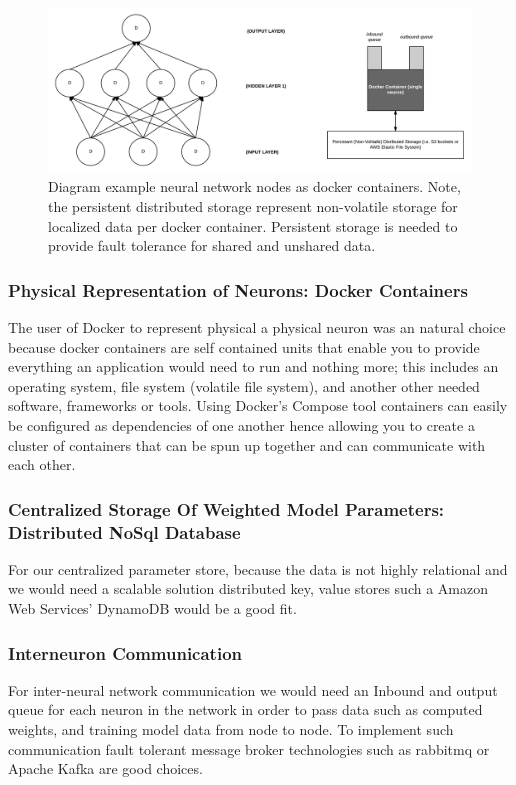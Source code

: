 \documentclass[conference]{IEEEtran}
\begin{document}
\begin{figure}
  \includegraphics[width=\textwidth]{ml_figure_draft.png}
  \caption{Diagram example neural network nodes as docker containers. Note, the persistent distributed storage represent non-volatile storage for localized data per docker container. Persistent storage is needed to provide fault tolerance for shared and unshared data.}
\end{figure}

\subsubsection{Physical Representation of Neurons: Docker Containers}
The user of Docker to represent physical a physical neuron was an natural choice because docker containers are self contained units that enable you to provide everything an application would need to run and nothing more; this includes an operating system, file system (volatile file system), and another other needed software, frameworks or tools. Using Docker's Compose tool \cite{docker-compose-doc} containers can easily be configured as dependencies of one another hence allowing you to create a cluster of containers that can be spun up together and can communicate with each other.

\subsubsection{Centralized Storage Of Weighted Model Parameters: Distributed NoSql Database}
For our centralized parameter store, because the data is not highly relational and we would need a scalable solution distributed key, value stores such a Amazon Web Services' DynamoDB would be a good fit.

\subsubsection{Interneuron Communication}
For inter-neural network communication we would need an Inbound and output queue for each neuron in the network in order to pass data such as computed weights, and training model data from node to node. To implement such communication fault tolerant message broker technologies such as rabbitmq \cite{rabbitmq-doc} or Apache Kafka \cite{kafka-doc} are good choices.
\end{document}
